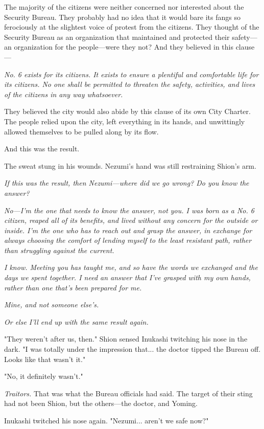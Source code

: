 The majority of the citizens were neither concerned nor interested about
the Security Bureau. They probably had no idea that it would bare its
fangs so ferociously at the slightest voice of protest from the
citizens. They thought of the Security Bureau as an organization that
maintained and protected their safety---an organization for the
people---were they not? And they believed in this clause---

\emph{No. 6 exists for its citizens. It exists to ensure a plentiful and
comfortable life for its citizens. No one shall be permitted to threaten
the safety, activities, and lives of the citizens in any way whatsoever.}

They believed the city would also abide by this clause of its own City
Charter. The people relied upon the city, left everything in its hands,
and unwittingly allowed themselves to be pulled along by its flow.

And this was the result.

The sweat stung in his wounds. Nezumi's hand was still restraining
Shion's arm.

\emph{If this was the result, then Nezumi---where did we go wrong? Do you know
the answer?}

\emph{No---I'm the one that needs to know the answer, not you. I was born as a
No. 6 citizen, reaped all of its benefits, and lived without any concern
for the outside or inside. I'm the one who has to reach out and grasp
the answer, in exchange for always choosing the comfort of lending
myself to the least resistant path, rather than struggling against the
current.}

\emph{I know. Meeting you has taught me, and so have the words we exchanged
and the days we spent together. I need an answer that I've grasped with
my own hands, rather than one that's been prepared for me.}

\emph{Mine, and not someone else's.}

\emph{Or else I'll end up with the same result again.}

"They weren't after us, then." Shion sensed Inukashi twitching his nose
in the dark. "I was totally under the impression that... the doctor
tipped the Bureau off. Looks like that wasn't it."

"No, it definitely wasn't."

\emph{Traitors.} That was what the Bureau officials had said. The target of
their sting had not been Shion, but the others---the doctor, and Yoming.

Inukashi twitched his nose again. "Nezumi... aren't we safe now?"

